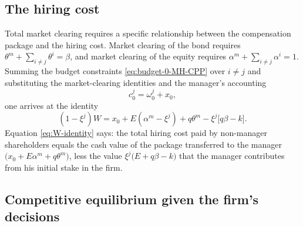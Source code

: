 \documentclass[11pt,a4paper,oneside]{book}
\theoremstyle{plain}
\theoremstyle{definition}
\theoremstyle{remark}
\numberwithin{equation}{chapter}
\begin{document}
\subsection{The hiring cost}

Total market clearing requires a specific relationship between the compensation package and the hiring cost.
Market clearing of the bond requires $\theta^m + \sum_{i \neq j} \theta^i = \beta$, and market clearing of the equity requires $\alpha^m + \sum_{i \neq j} \alpha^i = 1$.
Summing the budget constraints \eqref{eq:budget-0-MH-CPP} over $i \neq j$ and substituting the market-clearing identities and the manager's accounting
\begin{equation*}
  c^j_0 = \omega^j_0 + x_0,
\end{equation*}
one arrives at the identity
\begin{equation}\label{eq:W-identity}
  (1 - \xi^j) W = x_0 + E (\alpha^m - \xi^j) + q \theta^m - \xi^j \bigl[ q \beta - k \bigr].
\end{equation}
Equation \eqref{eq:W-identity} says: the total hiring cost paid by non-manager shareholders equals the cash value of the package transferred to the manager $\bigl( x_0 + E \alpha^m + q \theta^m \bigr)$, less the value $\xi^j \bigl( E + q \beta - k \bigr)$ that the manager contributes from his initial stake in the firm.

\subsection{Competitive equilibrium given the firm's decisions}
\end{document}
